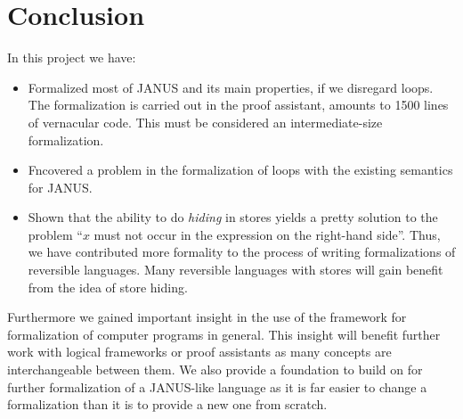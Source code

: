 \chapter{Conclusion}


In this project we have:
\begin{itemize}
\item Formalized most of JANUS and its main properties, if we
  disregard loops. The formalization is carried out in the \coq{}
  proof assistant, amounts to 1500 lines of vernacular code. This must
  be considered an intermediate-size formalization.
\item Fncovered a problem in the formalization of loops with
  the existing semantics for JANUS.
\item Shown that the ability to do \emph{hiding} in stores
  yields a pretty solution to the problem ``$x$ must not occur in the
  expression on the right-hand side''. Thus, we have contributed more
  formality to the process of writing formalizations of reversible
  languages. Many reversible languages with stores will gain benefit
  from the idea of store hiding.
\end{itemize}

Furthermore we gained important insight in the use of the \coq{}
framework for formalization of computer programs in general. This
insight will benefit further work with logical frameworks or proof
assistants as many concepts are interchangeable between them. We also
provide a foundation to build on for further formalization of a
JANUS-like language as it is far easier to change a formalization than
it is to provide a new one from scratch.

